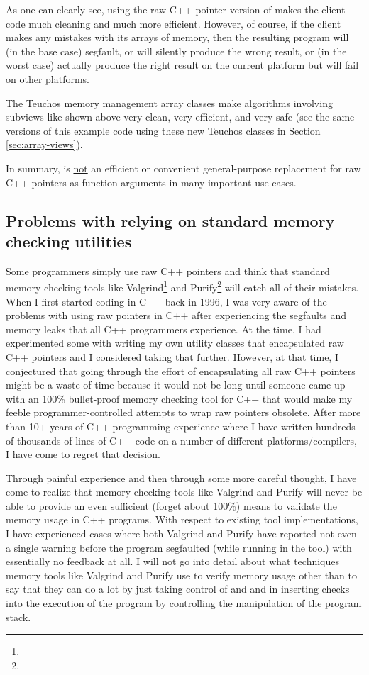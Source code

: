 \documentclass[pdf,ps2pdf,11pt]{SANDreport}
\begin{document}
As one can clearly see, using the raw C++ pointer version of
{} makes the client code much cleaning and
much more efficient.  However, of course, if the client makes any
mistakes with its arrays of memory, then the resulting program will
(in the base case) segfault, or will silently produce the wrong
result, or (in the worst case) actually produce the right result on
the current platform but will fail on other platforms.

The Teuchos memory management array classes make algorithms involving
subviews like shown above very clean, very efficient, and very safe
(see the same versions of this example code using these new Teuchos
classes in Section {}\ref{sec:array-views}).

In summary, {} is {}\underline{not} an efficient
or convenient general-purpose replacement for raw C++ pointers as
function arguments in many important use cases.


%
{}\subsection{Problems with relying on standard memory checking
utilities}
\label{sec:problems-with-mem-checkers}
%

Some programmers simply use raw C++ pointers and think that standard
memory checking tools like
Valgrind\footnote{{}} and
Purify\footnote{}
will catch all of their mistakes.  When I first started coding in C++
back in 1996, I was very aware of the problems with using raw pointers
in C++ after experiencing the segfaults and memory leaks that all C++
programmers experience.  At the time, I had experimented some with
writing my own utility classes that encapsulated raw C++ pointers and
I considered taking that further.  However, at that time, I
conjectured that going through the effort of encapsulating all raw C++
pointers might be a waste of time because it would not be long until
someone came up with an 100\% bullet-proof memory checking tool for
C++ that would make my feeble programmer-controlled attempts to wrap
raw pointers obsolete.  After more than 10+ years of C++ programming
experience where I have written hundreds of thousands of lines of C++
code on a number of different platforms/compilers, I have come to
regret that decision.

Through painful experience and then through some more careful thought,
I have come to realize that memory checking tools like Valgrind and
Purify will never be able to provide an even sufficient (forget about
100\%) means to validate the memory usage in C++ programs.  With
respect to existing tool implementations, I have experienced cases
where both Valgrind and Purify have reported not even a single warning
before the program segfaulted (while running in the tool) with
essentially no feedback at all.  I will not go into detail about what
techniques memory tools like Valgrind and Purify use to verify memory
usage other than to say that they can do a lot by just taking control
of {} and {} and in inserting checks
into the execution of the program by controlling the manipulation of
the program stack.
\end{document}
